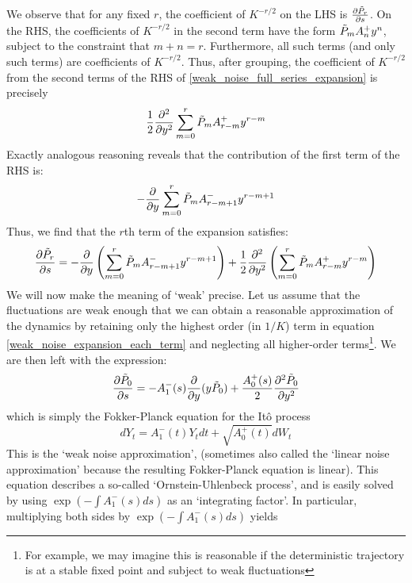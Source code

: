 We observe that for any fixed $r$, the coefficient of $K^{-r/2}$ on the LHS is $\frac{\partial \Tilde{P}_r}{\partial s}$. On the RHS, the coefficients of $K^{-r/2}$ in the second term have the form $\Tilde{P}_{m}A^+_{n}y^n$, subject to the constraint that $m+n=r$. Furthermore, all such terms (and only such terms) are coefficients of $K^{-r/2}$. Thus, after grouping, the coefficient of $K^{-r/2}$ from the second terms of the RHS of \eqref{weak_noise_full_series_expansion} is precisely
\begin{equation*}
\frac{1}{2}\frac{\partial^2}{\partial y^2}\sum\limits_{m=0}^{r}\Tilde{P}_{m}A^+_{r-m}y^{r-m}
\end{equation*}
Exactly analogous reasoning reveals that the contribution of the first term of the RHS is:
\begin{equation*}
-\frac{\partial}{\partial y}\sum\limits_{m=0}^{r}\Tilde{P}_{m}A^-_{r-m+1}y^{r-m+1}
\end{equation*}
Thus, we find that the $r$th term of the expansion satisfies:
\begin{equation}
\label{weak_noise_expansion_each_term}
\frac{\partial \Tilde{P}_r}{\partial s} = -\frac{\partial}{\partial y}\left(\sum\limits_{m=0}^{r}\Tilde{P}_{m}A^-_{r-m+1}y^{r-m+1}\right) + \frac{1}{2}\frac{\partial^2}{\partial y^2}\left(\sum\limits_{m=0}^{r}\Tilde{P}_{m}A^+_{r-m}y^{r-m}\right)
\end{equation}
We will now make the meaning of `weak' precise. Let us assume that the fluctuations are weak enough that we can obtain a reasonable approximation of the dynamics by retaining only the highest order (in $1/K$) term in equation \eqref{weak_noise_expansion_each_term} and neglecting all higher-order terms\footnote{For example, we may imagine this is reasonable if the deterministic trajectory is at a stable fixed point and subject to weak fluctuations}. We are then left with the expression:
\begin{equation}
\label{1D_WNA}
\frac{\partial \Tilde{P}_0}{\partial s} = -A^-_1(s)\frac{\partial}{\partial y}(y\Tilde{P}_0) + \frac{A^+_{0}(s)}{2}\frac{\partial^2 \Tilde{P}_{0}}{\partial y^2}
\end{equation}
which is simply the Fokker-Planck equation for the It\^{o} process
\begin{equation*}
dY_t = A^-_1(t)Y_tdt + \sqrt{A^+_0(t)}dW_t
\end{equation*}
This is the `weak noise approximation', (sometimes also called the `linear noise approximation' because the resulting Fokker-Planck equation is linear). This equation describes a so-called `Ornstein-Uhlenbeck process', and is easily solved by using $\exp(-\int A^-_1(s)ds)$ as an `integrating factor'. In particular, multiplying both sides by $\exp(-\int A^-_1(s)ds)$ yields
